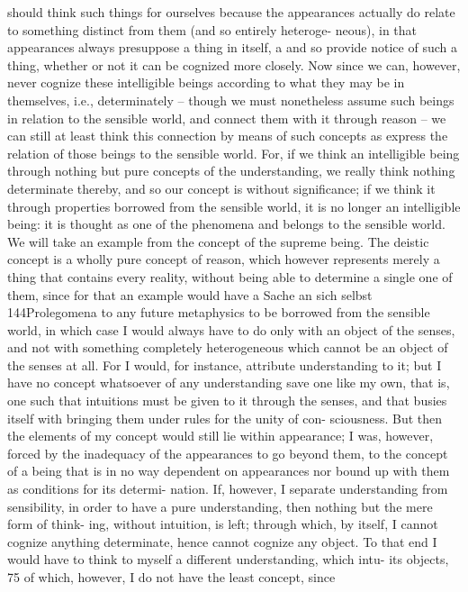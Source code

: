 should think such things for ourselves because the appearances actually
do relate to something distinct from them (and so entirely heteroge-
neous), in that appearances always presuppose a thing in itself, a and so
provide notice of such a thing, whether or not it can be cognized more
closely.
Now since we can, however, never cognize these intelligible beings
according to what they may be in themselves, i.e., determinately – though
we must nonetheless assume such beings in relation to the sensible world,
and connect them with it through reason – we can still at least think this
connection by means of such concepts as express the relation of those
beings to the sensible world. For, if we think an intelligible being through
nothing but pure concepts of the understanding, we really think nothing
determinate thereby, and so our concept is without signiﬁcance; if we
think it through properties borrowed from the sensible world, it is no
longer an intelligible being: it is thought as one of the phenomena and
belongs to the sensible world. We will take an example from the concept
of the supreme being.
The deistic concept is a wholly pure concept of reason, which however
represents merely a thing that contains every reality, without being able
to determine a single one of them, since for that an example would have
a
Sache an sich selbst
144Prolegomena to any future metaphysics
to be borrowed from the sensible world, in which case I would always
have to do only with an object of the senses, and not with something
completely heterogeneous which cannot be an object of the senses at
all. For I would, for instance, attribute understanding to it; but I have
no concept whatsoever of any understanding save one like my own, that
is, one such that intuitions must be given to it through the senses, and
that busies itself with bringing them under rules for the unity of con-
sciousness. But then the elements of my concept would still lie within
appearance; I was, however, forced by the inadequacy of the appearances
to go beyond them, to the concept of a being that is in no way dependent
on appearances nor bound up with them as conditions for its determi-
nation. If, however, I separate understanding from sensibility, in order
to have a pure understanding, then nothing but the mere form of think-
ing, without intuition, is left; through which, by itself, I cannot cognize
anything determinate, hence cannot cognize any object. To that end I
would have to think to myself a different understanding, which intu-
its objects, 75 of which, however, I do not have the least concept, since
